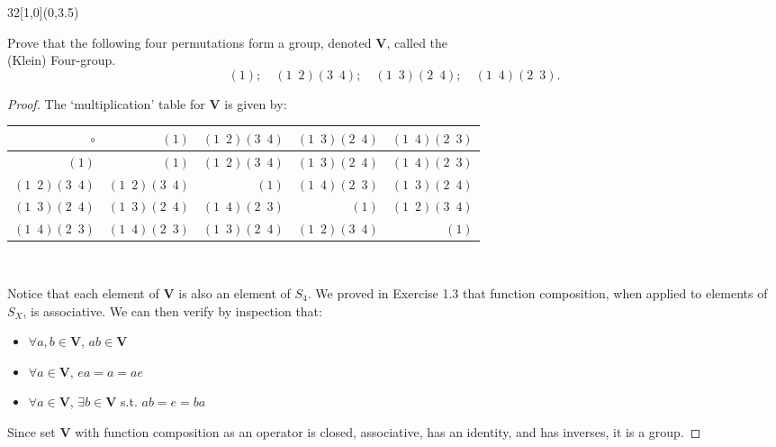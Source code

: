 \documentclass[12pt]{article}
\newenvironment{exercise}[2]{\begin{textblock}{32}[1,0](0,#2)\noindent#1\end{textblock}}{\vspace{1in}}
\begin{document}
\newpage

\begin{exercise}{1.36}{3.5}
	{\noindent}Prove that the following four permutations form a group, denoted $\mathbf{V}$, called the \\(Klein) Four-group.
	\[(1);\quad(1\enspace2)(3\enspace4);\quad(1\enspace3)(2\enspace4);\quad(1\enspace4)(2\enspace3).\]
	\bigskip

	\begin{proof}
		The `multiplication' table for $\mathbf{V}$ is given by:
		\bigskip

		\setlength{\tabcolsep}{1em} %
		\renewcommand{\arraystretch}{1.25}%
		\begin{tabular}{r|rrrr}
			$\circ$                    & $(1)$                      & $(1\enspace2)(3\enspace4)$ & $(1\enspace3)(2\enspace4)$ & $(1\enspace4)(2\enspace3)$ \\ \hline
			$(1)$                      & $(1)$                      & $(1\enspace2)(3\enspace4)$ & $(1\enspace3)(2\enspace4)$ & $(1\enspace4)(2\enspace3)$ \\
			$(1\enspace2)(3\enspace4)$ & $(1\enspace2)(3\enspace4)$ & $(1)$                      & $(1\enspace4)(2\enspace3)$ & $(1\enspace3)(2\enspace4)$ \\
			$(1\enspace3)(2\enspace4)$ & $(1\enspace3)(2\enspace4)$ & $(1\enspace4)(2\enspace3)$ & $(1)$                      & $(1\enspace2)(3\enspace4)$ \\
			$(1\enspace4)(2\enspace3)$ & $(1\enspace4)(2\enspace3)$ & $(1\enspace3)(2\enspace4)$ & $(1\enspace2)(3\enspace4)$ & $(1)$                      \\
		\end{tabular} \\
	\bigskip

	{\noindent}Notice that each element of $\mathbf{V}$ is also an element of $S_4$. We proved in Exercise 1.3 that function composition, when applied to elements of $S_X$, is associative.
	We can then verify by inspection that:
	\begin{itemize}
		\item $\forall a,b\in\mathbf{V}$, $ab \in \mathbf{V}$
		\item $\forall a\in\mathbf{V}$, $ea=a=ae$ 
		\item $\forall a\in\mathbf{V}$, $\exists b\in\mathbf{V}$ s.t. $ab=e=ba$ \quad[Specifically, $b=a$; \textsc{iow}, every element of $\mathbf{V}$ is its own inverse.]
	\end{itemize}
	Since set $\mathbf{V}$ with function composition as an operator is closed, associative, has an identity, and has inverses, it is a group.
	\end{proof}
\end{exercise}
\end{document}
